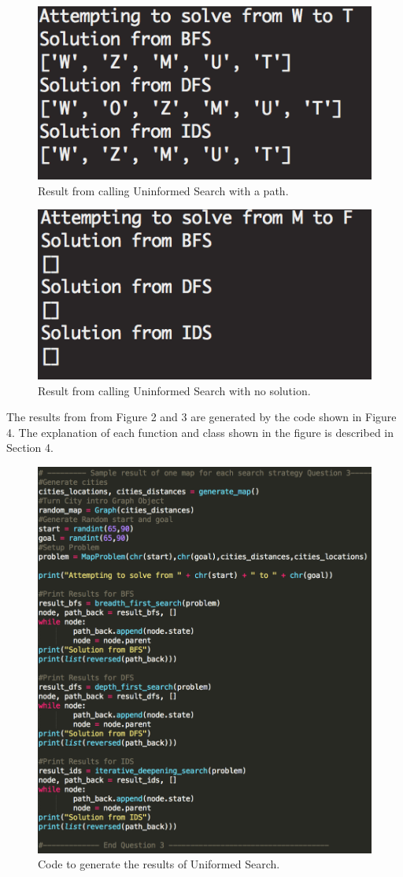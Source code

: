 \documentclass[12pt, letter]{article}
\begin{document}
\begin{figure}[htb]
  \centering
  \includegraphics[width=0.4 \textwidth]{./graphs/result_uninformed_found.png}
  \caption{Result from calling Uninformed Search with a path.}
\end{figure}


\begin{figure}[htb]
  \centering
  \includegraphics[width=0.4 \textwidth]{./graphs/result_uninformed_not_found.png}
  \caption{Result from calling Uninformed Search with no solution.}
\end{figure}

\FloatBarrier

The results from from Figure 2 and 3 are generated by the code shown in Figure 4. The explanation of each function and class shown in the figure is described in Section 4. 

\begin{figure}[htb]
  \centering
  \includegraphics[width=0.7 \textwidth]{./graphs/code_generate_result.png}
  \caption{Code to generate the results of Uniformed Search.}
\end{figure}
\end{document}
